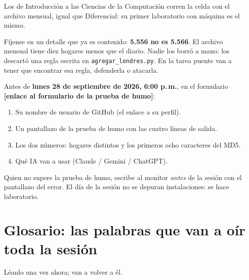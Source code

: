 \documentclass[12pt,letterpaper]{article}
\newcommand{\FECHA}{\textbf{lunes 28 de septiembre de 2026, 6:00 p.\,m.}}
\newcommand{\FORMULARIO}{\textbf{[enlace al formulario de la prueba de humo]}}
\begin{document}
Los de Introducción a las Ciencias de la Computación corren la celda con el archivo mensual, igual que Diferencial: su primer laboratorio con máquina es el mismo.

Fíjense en un detalle que ya es contenido: \textbf{5.556 no es 5.566}. El archivo mensual tiene diez hogares menos que el diario. Nadie los borró a mano: los descartó una regla escrita en \texttt{agregar\_londres.py}. En la tarea puente van a tener que encontrar esa regla, defenderla o atacarla.

\begin{cajaentrega}
Antes de \FECHA, en el formulario \FORMULARIO:
\begin{enumerate}[leftmargin=1.5em]
    \item Su nombre de usuario de GitHub (el enlace a su perfil).
    \item Un pantallazo de la prueba de humo con las cuatro líneas de salida.
    \item Los dos números: hogares distintos y los primeros ocho caracteres del MD5.
    \item Qué IA van a usar (Claude / Gemini / ChatGPT).
\end{enumerate}
Quien no supere la prueba de humo, escribe al monitor \emph{antes} de la sesión con el pantallazo del error. El día de la sesión no se depuran instalaciones: se hace laboratorio.
\end{cajaentrega}

\section{Glosario: las palabras que van a oír toda la sesión}
Léanlo una vez ahora; van a volver a él.
\end{document}
